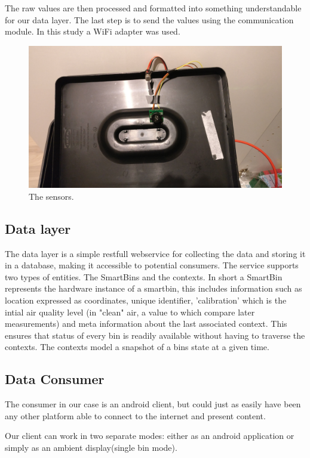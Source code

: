 The raw values are then processed and formatted into something understandable for our data layer.
The last step is to send the values using the communication module. In this study a WiFi adapter was used.

\begin{figure}
\centering
\includegraphics[scale=.05]{img/IMG_20161130_163302}
\caption{The sensors.}
\label{fig:sensors}
\end{figure}

\subsection{Data layer}
The data layer is a simple restfull webservice for collecting the data and storing it in a database, making it accessible to potential consumers.
The service supports two types of entities. The SmartBins and the contexts.
In short a SmartBin represents the hardware instance of a smartbin, this includes information such as location expressed as coordinates, unique identifier, 'calibration' which is the intial air quality level (in "clean" air, a value to which compare later measurements) and meta information about the last associated context.
This ensures that status of every bin is readily available without having to traverse the contexts.
The contexts model a snapshot of a bins state at a given time.

\subsection{Data Consumer}
The consumer in our case is an android client, but could just as easily have been any other platform able to connect to the internet and present content.

Our client can work in two separate modes: either as an android application or simply as an ambient display(single bin mode).

